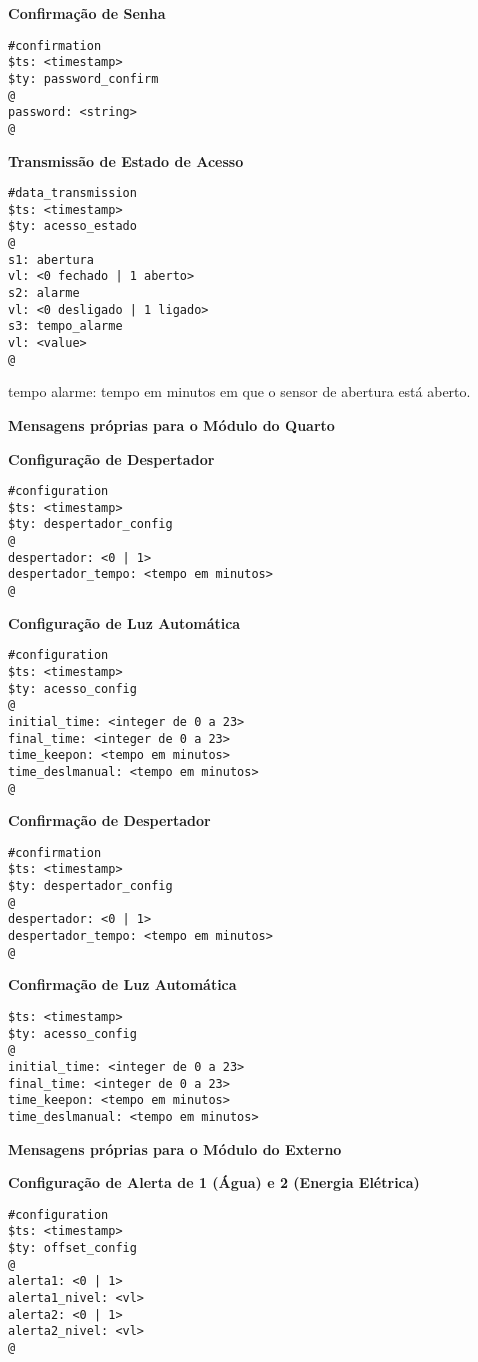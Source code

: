 \textbf{Confirmação de Senha}
\begin{lstlisting}
#confirmation
$ts: <timestamp>
$ty: password_confirm
@
password: <string>
@
\end{lstlisting}

\textbf{Transmissão de Estado de Acesso}
\begin{lstlisting}
#data_transmission
$ts: <timestamp>
$ty: acesso_estado
@
s1: abertura
vl: <0 fechado | 1 aberto>
s2: alarme
vl: <0 desligado | 1 ligado>
s3: tempo_alarme
vl: <value>
@
\end{lstlisting}

tempo alarme: tempo em minutos em que o sensor de abertura está aberto.

\textbf{Mensagens próprias para o Módulo do Quarto}

\textbf{Configuração de Despertador}
\begin{lstlisting}
#configuration
$ts: <timestamp>
$ty: despertador_config
@
despertador: <0 | 1>
despertador_tempo: <tempo em minutos>
@    
\end{lstlisting}

\textbf{Configuração de Luz Automática}
\begin{lstlisting}
#configuration
$ts: <timestamp>
$ty: acesso_config
@
initial_time: <integer de 0 a 23>
final_time: <integer de 0 a 23>
time_keepon: <tempo em minutos>
time_deslmanual: <tempo em minutos>
@
\end{lstlisting}

\textbf{Confirmação de Despertador}
\begin{lstlisting}
#confirmation
$ts: <timestamp>
$ty: despertador_config
@
despertador: <0 | 1>
despertador_tempo: <tempo em minutos>
@
\end{lstlisting}

\textbf{Confirmação de Luz Automática}
\begin{lstlisting}
$ts: <timestamp>
$ty: acesso_config
@
initial_time: <integer de 0 a 23>
final_time: <integer de 0 a 23>
time_keepon: <tempo em minutos>
time_deslmanual: <tempo em minutos>
\end{lstlisting}

\textbf{Mensagens próprias para o Módulo do Externo}

\textbf{Configuração de Alerta de 1 (Água) e 2 (Energia Elétrica)}
\begin{lstlisting}
#configuration
$ts: <timestamp>
$ty: offset_config
@
alerta1: <0 | 1>
alerta1_nivel: <vl>
alerta2: <0 | 1>
alerta2_nivel: <vl>
@
\end{lstlisting}

